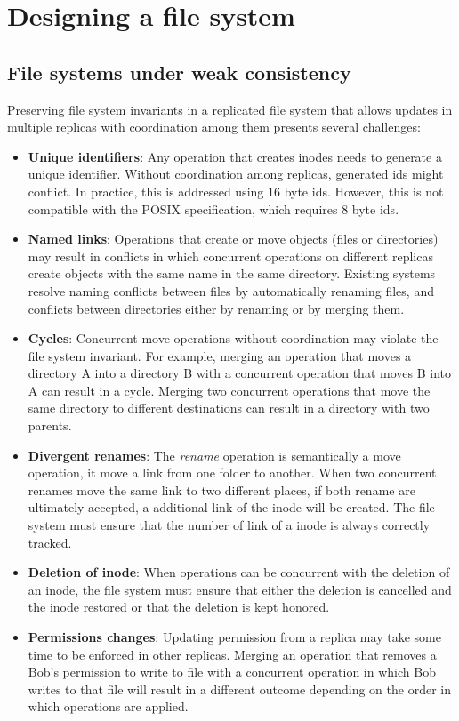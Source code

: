 \documentclass[sigconf, 10pt]{acmart}
\begin{document}
\section{Designing a file system}

\subsection{File systems under weak consistency}
\label{fs:weak}

Preserving file system invariants in a replicated file system
that allows updates in multiple replicas with coordination
among them presents several challenges:

\begin{itemize}
	\item \textbf{Unique identifiers}: Any operation that creates
	inodes needs to generate a unique identifier.
	Without coordination among replicas, generated ids might conflict.
	In practice, this is addressed using 16 byte ids.
	However, this is not compatible with the POSIX specification, which requires 8 byte ids.
	\item \textbf{Named links}: Operations that create or move objects (files or directories)
	may result in conflicts in which concurrent operations on different replicas create
	objects with the same name in the same directory.
	Existing systems resolve naming conflicts between files by automatically renaming
  files, and conflicts between directories either by renaming or by merging them.
    \item \textbf{Cycles}: Concurrent move operations without coordination may violate the file system invariant.
    For example, merging an operation that moves a directory A into a
	directory B with a concurrent operation that moves B into A can result in a cycle.
    Merging two concurrent operations that move the same directory to different destinations can result in a directory with two parents.
  \item \textbf{Divergent renames}: The \textit{rename} operation is semantically a move operation, it move a link from one folder to another. When two concurrent renames move the same link to two different places, if both rename are ultimately accepted, a additional link of the inode will be created. The file system must ensure that the number of link of a inode is always correctly tracked.
  \item \textbf{Deletion of inode}: When operations can be concurrent with the deletion of an inode, the file system
  must ensure that either the deletion is cancelled and the inode restored or that the deletion is kept honored.
  \item \textbf{Permissions changes}: Updating permission from a replica may take some time to be enforced in other replicas.
  Merging an operation that removes a Bob's permission to write to file with a concurrent operation in which Bob writes
  to that file will result in a different outcome depending on the order in which operations are applied.
\end{itemize}
\end{document}
